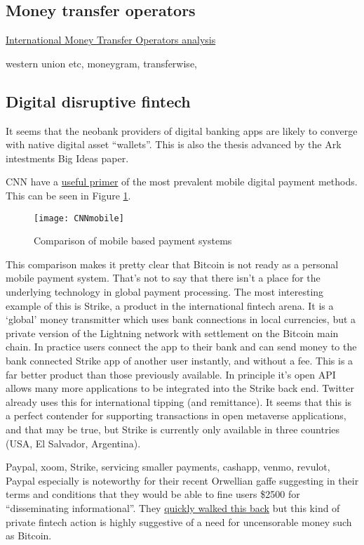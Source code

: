 \subsection{Money transfer operators}

\href{https://www.toptal.com/finance/market-research-analysts/international-money-transfer}{International Money Transfer Operators analysis}

western union etc, moneygram, transferwise,
\subsection{Digital disruptive fintech}
It seems that the neobank providers of digital banking apps are likely to converge with native digital asset ``wallets''. This is also the thesis advanced by the Ark intestments Big Ideas paper.\par
CNN have a \href{https://money.cnn.com/infographic/technology/mobile-payment-comparison/index.html}{useful primer} of the most prevalent mobile digital payment methods. This can be seen in Figure \ref{fig:CNNmobile}.
\begin{figure}
  \centering
    \texttt{[image: CNNmobile]}
  \caption{Comparison of mobile based payment systems}
  \label{fig:CNNmobile}
\end{figure}
This comparison makes it pretty clear that Bitcoin is not ready as a personal mobile payment system. That's not to say that there isn't a place for the underlying technology in global payment processing. 
The most interesting example of this is Strike, a product in the international fintech arena. It is a `global' money transmitter which uses bank connections in local currencies, but a private version of the Lightning network with settlement on the Bitcoin main chain. In practice users connect the app to their bank and can send money to the bank connected Strike app of another user instantly, and without a fee. This is a far better product than those previously available. In principle it's open API allows many more applications to be integrated into the Strike back end. Twitter already uses this for international tipping (and remittance). It seems that this is a perfect contender for supporting transactions in open metaverse applications, and that may be true, but Strike is currently only available in three countries (USA, El Salvador, Argentina).\par
Paypal, xoom, Strike, servicing smaller payments, cashapp, venmo, revulot, 
Paypal especially is noteworthy for their recent Orwellian gaffe suggesting in their terms and conditions that they would be able to fine users \$2500 for ``disseminating informational''. They \href{https://www.yahoo.com/video/paypal-policy-permits-company-fine-143946902.html}{quickly walked this back} but this kind of private fintech action is highly suggestive of a need for uncensorable money such as Bitcoin.\par 
